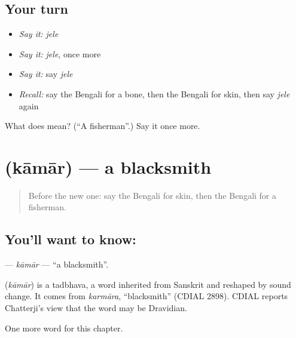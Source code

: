 \subsection*{Your turn}
\begin{itemize}
\raggedright
  \item \emph{Say it:} \emph{jele}
  \item \emph{Say it:} \emph{jele}, once more
  \item \emph{Say it:} say \emph{jele}
  \item \emph{Recall:} say the Bengali for a bone, then the Bengali for skin, then say \emph{jele} again
\end{itemize}

\begin{tcolorbox}[breakable,colback=teal!4,colframe=teal!35!black,title={Before you move on}]
What does  mean? (\textquotedblleft{}A fisherman\textquotedblright{}.) Say it once more.
\end{tcolorbox}
\section[\texorpdfstring{\bn{কামার} (kāmār)}{কামার (kāmār)}]{ (kāmār) — a blacksmith}

\label{lesson:BN-C125-kamar}



\begin{quote}
Before the new one: say the Bengali for skin, then the Bengali for a fisherman.
\end{quote}

\subsection*{You'll want to know: }
\textbf{} — \emph{kāmār} — \textquotedblleft{}a blacksmith\textquotedblright{}.

\begin{cousinweb}
\textbf{} (\emph{kāmār}) is a tadbhava, a word inherited from Sanskrit and reshaped by sound change. It comes from \emph{karmāra}, \textquotedblleft{}blacksmith\textquotedblright{} (CDIAL 2898). CDIAL reports Chatterji's view that the word may be Dravidian.
\end{cousinweb}

\begin{grammarlens}[title={What you've built}]
One more word for this chapter.
\end{grammarlens}

